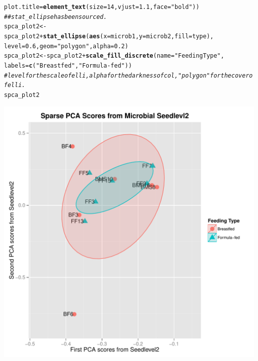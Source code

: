 \documentclass[12pt]{article}\usepackage[]{graphicx}\usepackage[]{color}
\makeatletter
\def\maxwidth{ %
  \ifdim\Gin@nat@width>\linewidth
    \linewidth
  \else
    \Gin@nat@width
  \fi
}
\newcommand{\hlnum}[1]{\textcolor[rgb]{0.686,0.059,0.569}{#1}}%
\newcommand{\hlstr}[1]{\textcolor[rgb]{0.192,0.494,0.8}{#1}}%
\newcommand{\hlcom}[1]{\textcolor[rgb]{0.678,0.584,0.686}{\textit{#1}}}%
\newcommand{\hlopt}[1]{\textcolor[rgb]{0,0,0}{#1}}%
\newcommand{\hlstd}[1]{\textcolor[rgb]{0.345,0.345,0.345}{#1}}%
\newcommand{\hlkwb}[1]{\textcolor[rgb]{0.69,0.353,0.396}{#1}}%
\newcommand{\hlkwc}[1]{\textcolor[rgb]{0.333,0.667,0.333}{#1}}%
\newcommand{\hlkwd}[1]{\textcolor[rgb]{0.737,0.353,0.396}{\textbf{#1}}}%
\newenvironment{kframe}{%
 \def\at@end@of@kframe{}%
 \ifinner\ifhmode%
  \def\at@end@of@kframe{\end{minipage}}%
  \begin{minipage}{\columnwidth}%
 \fi\fi%
 \def\FrameCommand##1{\hskip\@totalleftmargin \hskip-\fboxsep
 \colorbox{shadecolor}{##1}\hskip-\fboxsep
     \hskip-\linewidth \hskip-\@totalleftmargin \hskip\columnwidth}%
 \MakeFramed {\advance\hsize-\width
   \@totalleftmargin\z@ \linewidth\hsize
   \@setminipage}}%
 {\par\unskip\endMakeFramed%
 \at@end@of@kframe}
\newenvironment{knitrout}{}{} %
\makeatother
\begin{document}
\begin{knitrout}
\begin{kframe}
\begin{alltt}
                             \hlkwc{plot.title}\hlstd{=}\hlkwd{element_text}\hlstd{(}\hlkwc{size}\hlstd{=}\hlnum{14}\hlstd{,}\hlkwc{vjust}\hlstd{=}\hlnum{1.1}\hlstd{,}\hlkwc{face}\hlstd{=}\hlstr{"bold"}\hlstd{))}
\hlcom{## stat_ellipse has been sourced.}
\hlstd{spca_plot2}\hlkwb{<-}\hlstd{spca_plot2}\hlopt{+}\hlkwd{stat_ellipse}\hlstd{(}\hlkwd{aes}\hlstd{(}\hlkwc{x}\hlstd{=microb1,}\hlkwc{y}\hlstd{=microb2,}\hlkwc{fill}\hlstd{=type),}
                                    \hlkwc{level}\hlstd{=}\hlnum{0.6}\hlstd{,}\hlkwc{geom}\hlstd{=}\hlstr{"polygon"}\hlstd{,}\hlkwc{alpha}\hlstd{=}\hlnum{0.2}\hlstd{)}
\hlstd{spca_plot2}\hlkwb{<-}\hlstd{spca_plot2}\hlopt{+}\hlkwd{scale_fill_discrete}\hlstd{(}\hlkwc{name}\hlstd{=}\hlstr{"Feeding Type"}\hlstd{,}
                                            \hlkwc{labels}\hlstd{=}\hlkwd{c}\hlstd{(}\hlstr{"Breastfed"}\hlstd{,}\hlstr{"Formula-fed"}\hlstd{))}
\hlcom{#level for the scale of elli, alpha for the darkness of col,"polygon" for the cover of elli.}
\hlstd{spca_plot2}
\end{alltt}
\end{kframe}
\includegraphics[width=\maxwidth]{figure/sparse_pca-2} 

\end{knitrout}
\end{document}
